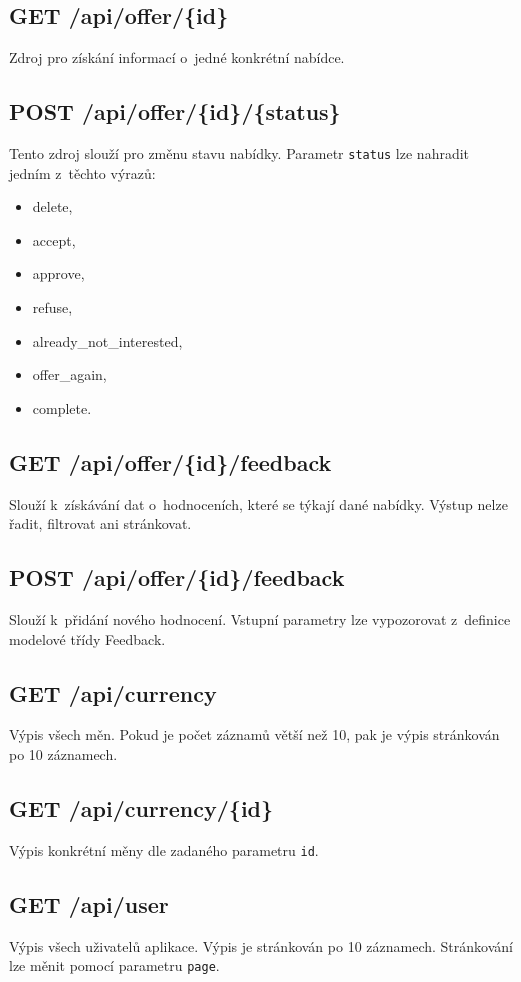 \subsection{GET /api/offer/\{id\}}
Zdroj pro získání informací o~jedné konkrétní nabídce.

\subsection{POST /api/offer/\{id\}/\{status\}}
Tento zdroj slouží pro změnu stavu nabídky. Parametr \texttt{status} lze nahradit jedním z~těchto výrazů:
\begin{itemize}
    \item delete,
    \item accept,
    \item approve,
    \item refuse,
    \item already\_not\_interested,
    \item offer\_again,
    \item complete.
\end{itemize}

\subsection{GET /api/offer/\{id\}/feedback}
Slouží k~získávání dat o~hodnoceních, které se týkají dané nabídky. Výstup nelze řadit, filtrovat ani stránkovat.

\subsection{POST /api/offer/\{id\}/feedback}
Slouží k~přidání nového hodnocení. Vstupní parametry lze vypozorovat z~definice modelové třídy Feedback.

\subsection{GET /api/currency}
Výpis všech měn. Pokud je počet záznamů větší než 10, pak je výpis stránkován po 10 záznamech.

\subsection{GET /api/currency/\{id\}}
Výpis konkrétní měny dle zadaného parametru \texttt{id}.

\subsection{GET /api/user}
Výpis všech uživatelů aplikace. Výpis je stránkován po 10 záznamech. Stránkování lze měnit pomocí parametru \texttt{page}.

